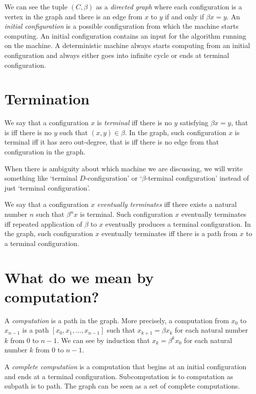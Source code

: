 We can see the tuple $(C,\beta)$ as a \emph{directed graph}
where each configuration is a vertex in the graph
and there is an edge from $x$ to $y$ if and only if $\beta x = y$.
An \emph{initial configuration} is a possible configuration from which the machine starts computing.
An initial configuration contains an input for the algorithm running on the machine.
A deterministic machine always starts computing from an initial configuration
and always either goes into infinite cycle or ends at terminal configuration.

\section{Termination}

We say that a configuration $x$ is \emph{terminal} iff
there is no $y$ satisfying $\beta x = y$, that is iff there is no $y$ such that $(x,y) \in \beta$.
In the graph, such configuration $x$ is terminal iff it has zero out-degree,
that is iff there is no edge from that configuration in the graph.

When there is ambiguity about which machine we are discussing,
we will write something like `terminal $D$-configuration'
or `$\beta$-terminal configuration' instead of just `terminal configuration'.

We say that a configuration $x$ \emph{eventually terminates}
iff there exists a natural number $n$ such that $\beta^n x$ is terminal.
Such configuration $x$ eventually terminates iff repeated application of $\beta$ to $x$
eventually produces a terminal configuration.
In the graph, such configuration $x$ eventually terminates iff
there is a path from $x$ to a terminal configuration.

\section{What do we mean by computation?}

A \emph{computation} is a path in the graph.
More precisely, a computation from $x_0$ to $x_{n-1}$
is a path $[x_0, x_1, \ldots, x_{n-1}]$
such that $x_{k+1} = \beta x_k$ for each natural number $k$ from $0$ to $n-1$.
We can see by induction that $x_k = \beta^k x_0$ for each natural number $k$ from $0$ to $n-1$.

A \emph{complete computation} is a computation that begins at an initial configuration
and ends at a terminal configuration.
Subcomputation is to computation as subpath is to path.
The graph can be seen as a set of complete computations.

